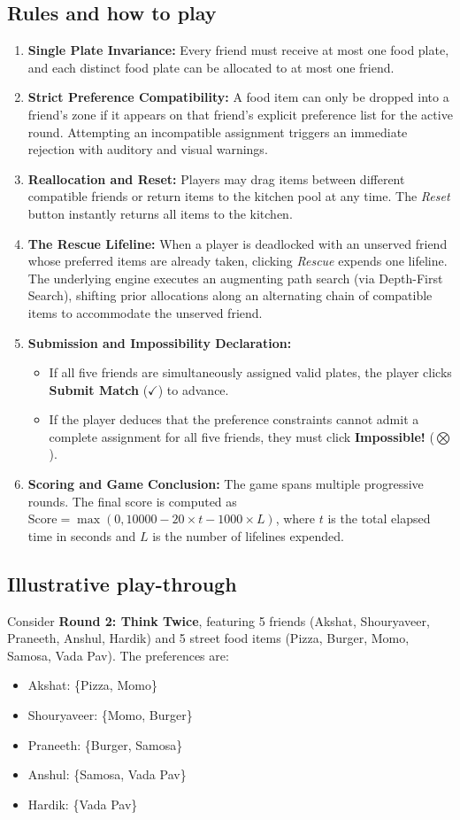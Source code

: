 \documentclass[11pt,a4paper]{article}
\begin{document}
\subsection{Rules and how to play}
\begin{enumerate}
  \item \textbf{Single Plate Invariance:} Every friend must receive at most one food plate, and each distinct food plate can be allocated to at most one friend.
  \item \textbf{Strict Preference Compatibility:} A food item can only be dropped into a friend's zone if it appears on that friend's explicit preference list for the active round. Attempting an incompatible assignment triggers an immediate rejection with auditory and visual warnings.
  \item \textbf{Reallocation and Reset:} Players may drag items between different compatible friends or return items to the kitchen pool at any time. The \textit{Reset} button instantly returns all items to the kitchen.
  \item \textbf{The Rescue Lifeline:} When a player is deadlocked with an unserved friend whose preferred items are already taken, clicking \textit{Rescue} expends one lifeline. The underlying engine executes an augmenting path search (via Depth-First Search), shifting prior allocations along an alternating chain of compatible items to accommodate the unserved friend.
  \item \textbf{Submission and Impossibility Declaration:}
  \begin{itemize}
    \item If all five friends are simultaneously assigned valid plates, the player clicks \textbf{Submit Match} ($\checkmark$) to advance.
    \item If the player deduces that the preference constraints cannot admit a complete assignment for all five friends, they must click \textbf{Impossible!} ($\bigotimes$).
  \end{itemize}
  \item \textbf{Scoring and Game Conclusion:} The game spans multiple progressive rounds. The final score is computed as $\text{Score} = \max(0, 10000 - 20 \times t - 1000 \times L)$, where $t$ is the total elapsed time in seconds and $L$ is the number of lifelines expended.
\end{enumerate}

\subsection{Illustrative play-through}
Consider \textbf{Round 2: Think Twice}, featuring 5 friends (Akshat, Shouryaveer, Praneeth, Anshul, Hardik) and 5 street food items (Pizza, Burger, Momo, Samosa, Vada Pav). The preferences are:
\begin{itemize}
  \item Akshat: \{Pizza, Momo\}
  \item Shouryaveer: \{Momo, Burger\}
  \item Praneeth: \{Burger, Samosa\}
  \item Anshul: \{Samosa, Vada Pav\}
  \item Hardik: \{Vada Pav\}
\end{itemize}
\end{document}
